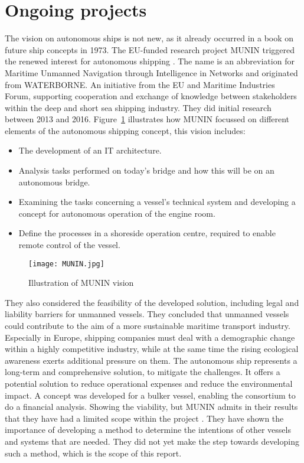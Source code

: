 \section{Ongoing projects}
The vision on autonomous ships is not new, as it already occurred in a book on future ship concepts in 1973. The EU-funded research project MUNIN triggered the renewed interest for autonomous shipping \cite{Saarni2018}. The name is an abbreviation for Maritime Unmanned Navigation through Intelligence in Networks and originated from WATERBORNE. An initiative from the EU and Maritime Industries Forum, supporting cooperation and exchange of knowledge between stakeholders within the deep and short sea shipping industry. They did initial research between 2013 and 2016. Figure~\ref{fig:MUNIN} illustrates how MUNIN focussed on different elements of the autonomous shipping concept, this vision includes: 
\begin{itemize}
	\item The development of an IT architecture. 
	\item Analysis tasks performed on today's bridge and how this will be on an autonomous bridge. 
	\item Examining the tasks concerning a vessel’s technical system and developing a concept for autonomous operation of the engine room. 
	\item Define the processes in a shoreside operation centre, required to enable remote control of the vessel. 
\end{itemize}

\begin{figure}[hbp]
	\centering
	\texttt{[image: MUNIN.jpg]}
	\caption{Illustration of MUNIN vision}
	\label{fig:MUNIN}
\end{figure}

They also considered the feasibility of the developed solution, including legal and liability barriers for unmanned vessels.
They concluded that unmanned vessels could contribute to the aim of a more sustainable maritime transport industry. Especially in Europe, shipping companies must deal with a demographic change within a highly competitive industry, while at the same time the rising ecological awareness exerts additional pressure on them. The autonomous ship represents a long-term and comprehensive solution, to mitigate the challenges. It offers a potential solution to reduce operational expenses and reduce the environmental impact.
A concept was developed for a bulker vessel, enabling the consortium to do a financial analysis. Showing the viability, but MUNIN admits in their results that they have had a limited scope within the project \cite{MUNIN2016}. They have shown the importance of developing a method to determine the intentions of other vessels and systems that are needed. They did not yet make the step towards developing such a method, which is the scope of this report.

